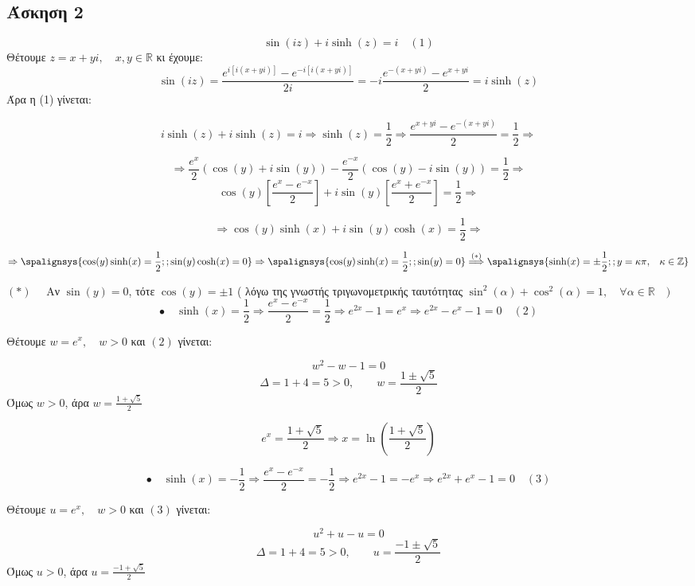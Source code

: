 \documentclass[12pt]{article}
\begin{document}
\newpage
 \subsection{Άσκηση 2}

$$ \sin(iz)+ i\sinh(z)=i \quad (1)$$
Θέτουμε $z=x+yi, \quad x,y\in \mathbb{R}$ κι έχουμε:\\

$$ \sin(iz)=\frac{e^{i [i(x+yi)]}-e^{-i[i(x+yi)]}}{2i} = -i \frac{e^{-(x+yi)}-e^{x+yi}}{2}= i\sinh(z) $$
Άρα η (1) γίνεται:

$$
i\sinh(z)+i\sinh(z)=i \Rightarrow \sinh(z)=\frac{1}{2}\Rightarrow 
\frac{e^{x+yi}-e^{-(x+yi)}}{2}=\frac{1}{2} \Rightarrow $$

$$
\Rightarrow \frac{e^x}{2}(\cos(y)+i\sin(y))-\frac{e^{-x}}{2}(\cos(y)-i\sin(y))=\frac{1}{2} \Rightarrow$$
$$
\cos(y)\left[ \frac{e^x-e^{-x}}{2} \right]+i\sin(y)\left[ \frac{e^x+e^{-x}}{2} \right]=\frac{1}{2}
\Rightarrow
$$ 

$$ \Rightarrow \cos(y)\sinh(x)+i\sin(y)\cosh(x)=\frac{1}{2} \Rightarrow $$

\[
\Rightarrow
\spalignsys{ \cos(y)\sinh(x)=\frac{1}{2} ; ; \sin(y)\cosh(x)=0}
\Rightarrow
\spalignsys{ \cos(y)\sinh(x)=\frac{1}{2} ; ;  \sin(y)=0}
\overset{(\ast)}{\Longrightarrow}
\spalignsys{\sinh(x)=\pm\frac{1}{2} ; ;  y = \kappa \pi {,} \quad  \kappa \in \mathbb{Z} }
\] 

$(\ast) \quad$  
Αν $\sin(y)=0$, τότε $ \cos(y)= \pm 1 $ ( λόγω της γνωστής τριγωνομετρικής ταυτότητας $\sin^2(\alpha)+\cos^2(\alpha)=1, \quad \forall \alpha \in \mathbb{R} \quad)$\\

$$\bullet \quad \sinh(x)= \frac{1}{2} \Rightarrow \frac{e^x-e^{-x}}{2}=  \frac{1}{2} \Rightarrow
e^{2x}-1=  e^x \Rightarrow e^{2x}-e^x -1=0 \quad (2) $$

Θέτουμε $ w=e^x, \quad w>0 $ και $(2)$ γίνεται:

$$ w^2-w-1=0 $$
 $$ \Delta=1+4=5>0, \qquad  w=\frac{1\pm \sqrt{5}}{2}$$
 Όμως $w>0$, άρα $ w=\frac{1 + \sqrt{5}}{2}$
 
 $$ e^x=\frac{1 + \sqrt{5}}{2} \Rightarrow x= \ln\left( \frac{1 + \sqrt{5}}{2} \right) $$
 
 $$\bullet \quad  \sinh(x)= -\frac{1}{2} \Rightarrow \frac{e^x-e^{-x}}{2}=  -\frac{1}{2} \Rightarrow
e^{2x}-1=  -e^x \Rightarrow e^{2x}+e^x -1=0 \quad (3) $$

Θέτουμε $ u=e^x, \quad w>0 $ και $(3)$ γίνεται:

$$ u^2+u-u=0 $$
 $$ \Delta=1+4=5>0, \qquad  u=\frac{-1\pm \sqrt{5}}{2}$$
 Όμως $u>0$, άρα $ u=\frac{-1 + \sqrt{5}}{2}$
 
\end{document}

